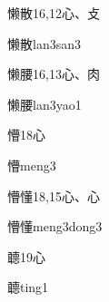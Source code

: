 \begin{entry}{懒散}{16,12}{⼼、⽁}
  \begin{phonetics}{懒散}{lan3san3}
  \end{phonetics}
\end{entry}

\begin{entry}{懒腰}{16,13}{⼼、⾁}
  \begin{phonetics}{懒腰}{lan3yao1}
  \end{phonetics}
\end{entry}

\begin{entry}{懵}{18}{⼼}
  \begin{phonetics}{懵}{meng3}
  \end{phonetics}
\end{entry}

\begin{entry}{懵懂}{18,15}{⼼、⼼}
  \begin{phonetics}{懵懂}{meng3dong3}
  \end{phonetics}
\end{entry}

\begin{entry}{聼}{19}{⼼}
  \begin{phonetics}{聼}{ting1}
  \end{phonetics}
\end{entry}


